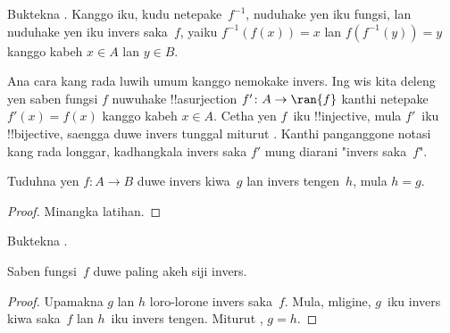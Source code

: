 \documentclass[../../../include/open-logic-section]{subfiles}
\begin{document}
\begin{prob}
Buktekna . Kanggo iku, kudu
netepake~$f^{-1}$, nuduhake yen iku fungsi, lan nuduhake yen iku
invers saka~$f$, yaiku $f^{-1}(f(x)) = x$ lan $f(f^{-1}(y)) = y$ kanggo
kabeh $x \in A$ lan $y \in B$.
\end{prob}

\begin{explain}
Ana cara kang rada luwih umum kanggo nemokake invers. Ing
 wis kita deleng yen saben fungsi $f$ nuwuhake !!a{surjection} $f'
\colon A \to \ran{f}$ kanthi netepake $f'(x) = f(x)$ kanggo kabeh $x \in A$.
Cetha yen $f$~iku !!{injective}, mula $f'$~iku !!{bijective}, saengga
duwe invers tunggal miturut . Kanthi
panganggone notasi kang rada longgar, kadhangkala invers saka $f'$
mung diarani "invers saka~$f$".
\end{explain}

\begin{prop}%
  Tuduhna yen $f\colon A \to B$ duwe invers kiwa~$g$ lan invers
  tengen~$h$, mula $h = g$.
\end{prop}

\begin{proof}
  Minangka latihan.
\end{proof}

\begin{prob}
  Buktekna .
\end{prob}

\begin{prop}
Saben fungsi~$f$ duwe paling akeh siji invers.
\end{prop}

\begin{proof}
  Upamakna $g$ lan $h$ loro-lorone invers saka~$f$. Mula, mligine,
  $g$~iku invers kiwa saka~$f$ lan $h$~iku invers tengen. Miturut
  , $g = h$.
\end{proof}
\end{document}

